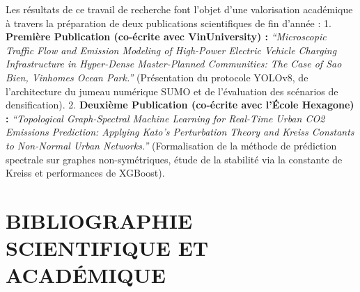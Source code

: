 \documentclass[10pt, a4paper]{article}
\begin{document}
Les résultats de ce travail de recherche font l'objet d'une valorisation
académique à travers la préparation de deux publications scientifiques
de fin d'année : 1. \textbf{Première Publication (co-écrite avec
VinUniversity) :} \emph{``Microscopic Traffic Flow and Emission Modeling
of High-Power Electric Vehicle Charging Infrastructure in Hyper-Dense
Master-Planned Communities: The Case of Sao Bien, Vinhomes Ocean
Park.''} (Présentation du protocole YOLOv8, de l'architecture du jumeau
numérique SUMO et de l'évaluation des scénarios de densification). 2.
\textbf{Deuxième Publication (co-écrite avec l'École Hexagone) :}
\emph{``Topological Graph-Spectral Machine Learning for Real-Time Urban
CO2 Emissions Prediction: Applying Kato's Perturbation Theory and Kreiss
Constants to Non-Normal Urban Networks.''} (Formalisation de la méthode
de prédiction spectrale sur graphes non-symétriques, étude de la
stabilité via la constante de Kreiss et performances de XGBoost).

\newpage

\section{BIBLIOGRAPHIE SCIENTIFIQUE ET
ACADÉMIQUE}\label{bibliographie-scientifique-et-acaduxe9mique}
\end{document}
